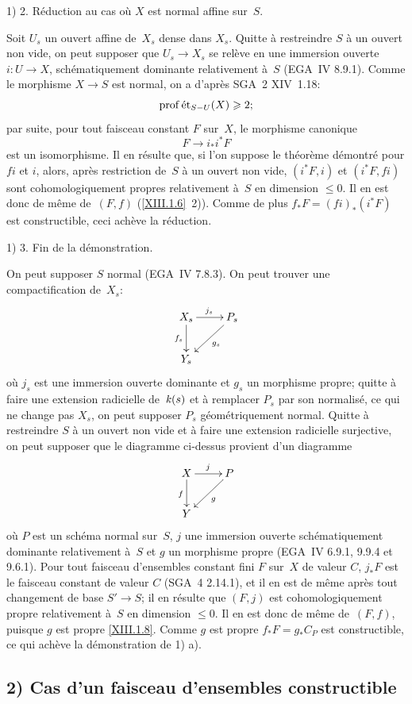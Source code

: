 1) 2. R\'eduction au cas o\`u $X$ est normal affine sur~$S$.

Soit $U_s$ un ouvert affine de~$X_s$ dense dans $X_s$. Quitte \`a
restreindre $S$ \`a un ouvert non vide, on peut supposer que $U_s
\to X_s$ se rel\`eve en une immersion ouverte $i\colon U\to X$,
sch\'ematiquement dominante relativement \`a~$S$ (EGA~IV
8.9.1). Comme le morphisme $X \to S$ est normal, on a d'apr\`es
SGA~2 XIV~1.18:
$$
\operatorname{prof} \mathrm{\acute{e}t}_{S- U} (X) \geqslant 2  ;
$$
par suite, pour tout faisceau constant $F$ sur~$X$, le morphisme
canonique
$$
F \to i_*i^*F
$$
est un isomorphisme. Il en r\'esulte que, si l'on suppose le
th\'eor\`eme d\'emontr\'e pour $fi$ et $i$, alors, apr\`es
restriction de~$S$ \`a un ouvert non vide, $(i^*F,i)$ et $(i^*F,fi)$
sont cohomologiquement propres relativement \`a~$S$ en dimension
$\le 0$. Il en est donc de m\^eme de~$(F,f)$ (\ref{XIII.1.6}~2)). Comme de plus $f_* F=(fi)_*(i^*F)$ est constructible, ceci
ach\`eve la r\'eduction.

1) 3. Fin de la d\'emonstration.

On peut supposer $S$ normal (EGA~IV 7.8.3). On peut trouver une
compactification de~$X_s$:
$$
\xymatrix{{X_s}\ar[r]^{j_s}\ar[d]_{f_s}&{P_s}\ar[ld]^{g_s}\\{Y_s}}
$$
o\`u $j_s$ est une immersion ouverte dominante et $g_s$ un morphisme
propre; quitte \`a faire une extension radicielle de~$\mathit{k}(s)$ et \`a
remplacer $P_s$ par son normalis\'e, ce qui ne change pas $X_s$, on
peut supposer $P_s$ g\'eom\'etriquement normal. Quitte \`a
restreindre $S$ \`a un ouvert non vide et \`a faire une extension
radicielle surjective, on peut supposer que le diagramme ci-dessus
provient d'un diagramme
$$
\xymatrix{{X}\ar[r]^{j}\ar[d]_{f}&{P}\ar[ld]^{g}\\{Y}}
$$
o\`u $P$ est un sch\'ema normal sur~$S$, $j$ une immersion ouverte
sch\'ematiquement dominante relativement \`a~$S$ et $g$ un
morphisme propre (EGA~IV 6.9.1, 9.9.4 et 9.6.1). Pour tout faisceau
d'ensembles constant fini $F$ sur~$X$ de valeur $C$, $j_*F$ est le
faisceau constant de valeur $C$ (SGA~4 2.14.1), et il en est de
m\^eme apr\`es tout changement de base $S' \to S$; il en
r\'esulte que $(F,j)$ est cohomologiquement propre relativement
\`a~$S$ en dimension $\le 0$. Il en est donc de m\^eme de~$(F,f)$,
puisque $g$ est propre \eqref{XIII.1.8}. Comme $g$ est propre
$f_*F=g_*C_P$ est constructible, ce qui ach\`eve la
d\'emonstration de 1) a).

\subsection*{2) Cas d'un faisceau d'ensembles constructible}

